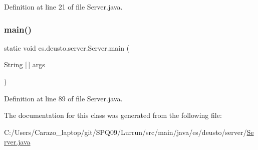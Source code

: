 Definition at line 21 of file Server.\+java.

\mbox{\label{classes_1_1deusto_1_1server_1_1_server_a750bb0d7dbd89246a3602f2e20d03fb5}} 
\subsubsection{\texorpdfstring{main()}{main()}}
{\footnotesize\ttfamily static void es.\+deusto.\+server.\+Server.\+main (\begin{DoxyParamCaption}\item[{String \mbox{[}$\,$\mbox{]}}]{args }\end{DoxyParamCaption})\hspace{0.3cm}{\ttfamily [static]}}



Definition at line 89 of file Server.\+java.



The documentation for this class was generated from the following file\+:\begin{DoxyCompactItemize}
\item 
C\+:/\+Users/\+Carazo\+\_\+laptop/git/\+S\+P\+Q09/\+Lurrun/src/main/java/es/deusto/server/\hyperlink{_server_8java}{Server.\+java}\end{DoxyCompactItemize}
